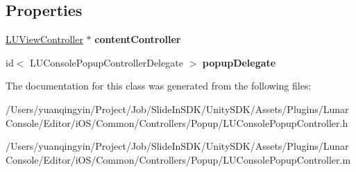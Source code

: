 \subsection*{Properties}
\begin{DoxyCompactItemize}
\item 
\mbox{\label{interface_l_u_console_popup_controller_ac051537f4441181859d2999b68c234e9}} 
\mbox{\hyperlink{interface_l_u_view_controller}{L\+U\+View\+Controller}} $\ast$ {\bfseries content\+Controller}
\item 
\mbox{\label{interface_l_u_console_popup_controller_acf4b926e356d64c2a9219760e89b4cb9}} 
id$<$ L\+U\+Console\+Popup\+Controller\+Delegate $>$ {\bfseries popup\+Delegate}
\end{DoxyCompactItemize}


The documentation for this class was generated from the following files\+:\begin{DoxyCompactItemize}
\item 
/\+Users/yuanqingyin/\+Project/\+Job/\+Slide\+In\+S\+D\+K/\+Unity\+S\+D\+K/\+Assets/\+Plugins/\+Lunar\+Console/\+Editor/i\+O\+S/\+Common/\+Controllers/\+Popup/L\+U\+Console\+Popup\+Controller.\+h\item 
/\+Users/yuanqingyin/\+Project/\+Job/\+Slide\+In\+S\+D\+K/\+Unity\+S\+D\+K/\+Assets/\+Plugins/\+Lunar\+Console/\+Editor/i\+O\+S/\+Common/\+Controllers/\+Popup/L\+U\+Console\+Popup\+Controller.\+m\end{DoxyCompactItemize}
